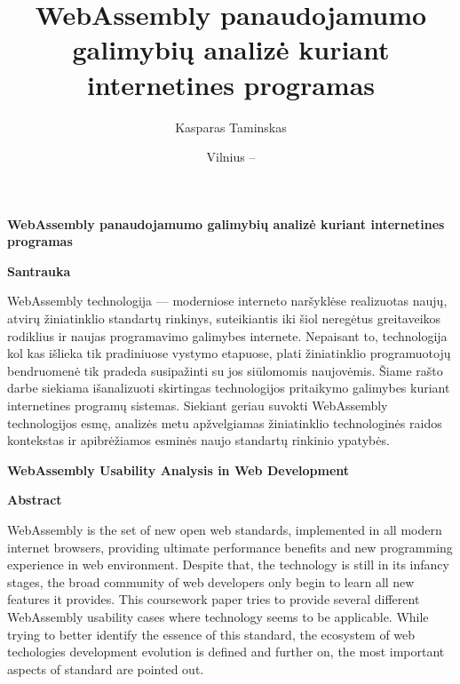 \documentclass{VUMIFPSkursinis}
\title{WebAssembly panaudojamumo galimybių analizė kuriant internetines programas }
\author{Kasparas Taminskas}
\date{Vilnius – \the\year}
\begin{document}
\lstset{language=C}

\maketitle
\cleardoublepage{}

\begin{center}{\large\textbf{WebAssembly panaudojamumo galimybių analizė kuriant internetines programas}}\end{center}
\begin{small}
\vspace{2\baselineskip}
\begin{center}\textbf{Santrauka}\end{center}
WebAssembly technologija — moderniose interneto naršyklėse realizuotas naujų, atvirų žiniatinklio standartų rinkinys, suteikiantis iki šiol neregėtus greitaveikos rodiklius ir naujas programavimo galimybes internete. Nepaisant to, technologija kol kas išlieka tik pradiniuose vystymo etapuose, plati žiniatinklio programuotojų bendruomenė tik pradeda susipažinti su jos siūlomomis naujovėmis. Šiame rašto darbe siekiama išanalizuoti skirtingas technologijos pritaikymo galimybes kuriant internetines programų sistemas. Siekiant geriau suvokti WebAssembly technologijos esmę, analizės metu apžvelgiamas žiniatinklio technologinės raidos kontekstas ir apibrėžiamos esminės naujo standartų rinkinio ypatybės. 
\vspace{\baselineskip}
\end{small}
\vspace{\baselineskip}
\thispagestyle{empty}
\begin{center}{\large\textbf{WebAssembly Usability Analysis in Web Development}}\end{center}
\begin{small}
\vspace{2\baselineskip}
\begin{center}\textbf{Abstract}\end{center}
WebAssembly is the set of new open web standards, implemented in all modern internet browsers, providing ultimate performance benefits and new programming experience in web environment. Despite that, the technology is still in its infancy stages, the broad community of web developers only begin to learn all new features it provides. This coursework paper tries to provide several different WebAssembly usability cases where technology seems to be applicable. While trying to better identify the essence of this standard, the ecosystem of web techologies development evolution is defined and further on, the most important aspects of standard are pointed out.

\vspace{\baselineskip}
\end{small}
\vspace{\baselineskip}
\end{document}
